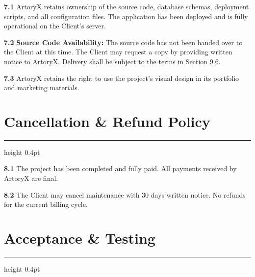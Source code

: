 \documentclass[a4paper, 11pt]{article}
\newcommand{\sectionrule}{%
  {\color{bordergray}\hrule height 0.4pt}%
  \vspace{5pt}%
}
\newcommand{\clausenum}[1]{%
  {\color{accent}\textbf{#1}}\;%
}
\begin{document}
{\small
\clausenum{7.1} ArtoryX retains ownership of the source code, database schemas, deployment scripts, and all configuration files. The application has been deployed and is fully operational on the Client's server.

\clausenum{7.2}\textbf{Source Code Availability:}
The source code has not been handed over to the Client at this time. The Client may request a copy by providing written notice to ArtoryX. Delivery shall be subject to the terms in Section 9.6.

\clausenum{7.3} ArtoryX retains the right to use the project's visual design in its portfolio and marketing materials.
}


\section{Cancellation \& Refund Policy}
\sectionrule

{\small
\clausenum{8.1} The project has been completed and fully paid. All payments received by ArtoryX are final.

\clausenum{8.2} The Client may cancel maintenance with 30 days written notice. No refunds for the current billing cycle.
}


\section{Acceptance \& Testing}
\sectionrule
\end{document}
